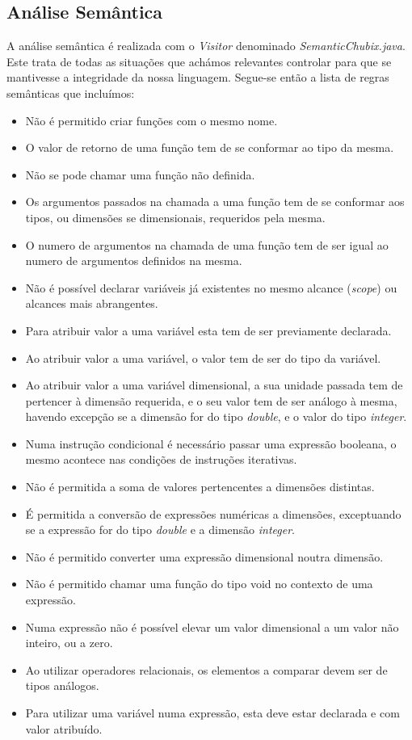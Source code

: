 \documentclass[10pt,portuguese]{article}
\begin{document}
\subsection{Análise Semântica}

\par A análise semântica é realizada com o \emph{Visitor} denominado \emph{SemanticChubix.java}. Este trata de todas as situações que achámos relevantes controlar para que se mantivesse a integridade da nossa linguagem. Segue-se então a lista de regras semânticas que incluímos:
\begin{itemize}
    \item Não é permitido criar funções com o mesmo nome.
    \item O valor de retorno de uma função tem de se conformar ao tipo da mesma.
    \item Não se pode chamar uma função não definida.
    \item Os argumentos passados na chamada a uma função tem de se conformar aos tipos, ou dimensões se dimensionais, requeridos pela mesma.
    \item O numero de argumentos na chamada de uma função tem de ser igual ao numero de argumentos definidos na mesma.
    \item Não é possível declarar variáveis já existentes no mesmo alcance (\emph{scope}) ou alcances mais abrangentes.
    \item Para atribuir valor a uma variável esta tem de ser previamente declarada.
    \item Ao atribuir valor a uma variável, o valor tem de ser do tipo da variável.
    \item Ao atribuir valor a uma variável dimensional, a sua unidade passada tem de pertencer à dimensão requerida, e o seu valor tem de ser análogo à mesma, havendo excepção se a dimensão for do tipo \emph{double}, e o valor do tipo \emph{integer}.
    \item Numa instrução condicional é necessário passar uma expressão booleana, o mesmo acontece nas condições de instruções iterativas.
    \item Não é permitida a soma de valores pertencentes a dimensões distintas.
    \item É permitida a conversão de expressões numéricas a dimensões, exceptuando se a expressão for do tipo \emph{double} e a dimensão \emph{integer}. 
    \item Não é permitido converter uma expressão dimensional noutra dimensão.
    \item Não é permitido chamar uma função do tipo void no contexto de uma expressão.
    \item Numa expressão não é possível elevar um valor dimensional a um valor não inteiro, ou a zero.
    \item Ao utilizar operadores relacionais, os elementos a comparar devem ser de tipos análogos.
    \item Para utilizar uma variável numa expressão, esta deve estar declarada e com valor atribuído.
\end{itemize}
\end{document}
